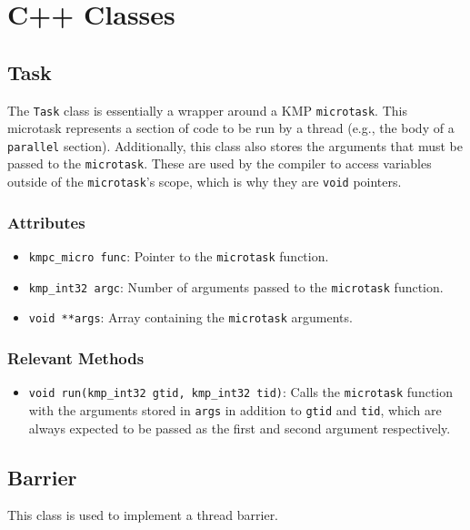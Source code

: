 \section{C++ Classes}
\label{sec:cpp-classes}

\subsection{Task}

The \texttt{Task} class is essentially a wrapper around a KMP \texttt{microtask}. This microtask
represents a section of code to be run by a thread (e.g., the body of a \texttt{parallel} section).
Additionally, this class also stores the arguments that must be passed to the \texttt{microtask}.
These are used by the compiler to access variables outside of the \texttt{microtask}'s scope, which
is why they are \texttt{void} pointers.

\subsubsection{Attributes}

\begin{itemize}
	\item \texttt{kmpc_micro func}: Pointer to the \texttt{microtask} function.
	\item \texttt{kmp_int32 argc}: Number of arguments passed to the \texttt{microtask} function.
	\item \texttt{void **args}: Array containing the \texttt{microtask} arguments.
\end{itemize}

\subsubsection{Relevant Methods}

\begin{itemize}
	\item \texttt{void run(kmp_int32 gtid, kmp_int32 tid)}: Calls the \texttt{microtask} function
	      with the arguments stored in \texttt{args} in addition to \texttt{gtid} and \texttt{tid},
	      which are always expected to be passed as the first and second argument respectively.
\end{itemize}

\subsection{Barrier}
\label{subsec:barrier}
This class is used to implement a thread barrier.

